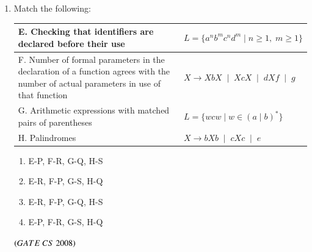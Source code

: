 \documentclass[journal, onecolumn]{IEEEtran}
\numberwithin{equation}{enumi}
\numberwithin{figure}{enumi}
\begin{document}
\begin{enumerate}
\item Match the following:

\begin{tabular}{|p{5cm}|p{7cm}|}
\hline
E. Checking that identifiers are declared before their use 
& $L = \{ a^n b^m c^n d^m \mid n \geq 1,\; m \geq 1 \}$ \\
\hline
F. Number of formal parameters in the declaration of a function agrees with the number of actual parameters in use of that function 
& $X \rightarrow X b X \;\mid\; X c X \;\mid\; d X f \;\mid\; g$ \\
\hline
G. Arithmetic expressions with matched pairs of parentheses 
& $L = \{ w c w \mid w \in (a \mid b)^* \}$ \\
\hline
H. Palindromes 
& $X \rightarrow b X b \;\mid\; c X c \;\mid\; e$ \\
\hline
\end{tabular}

\begin{multicols}{2}
\begin{enumerate}
    \item E-P, F-R, G-Q, H-S
    \item E-R, F-P, G-S, H-Q
    \item E-R, F-P, G-Q, H-S
    \item E-P, F-R, G-S, H-Q
\end{enumerate}
\end{multicols}
\hfill $\left(GATE\ CS\  2008\right)$


\end{enumerate}
\end{document}
